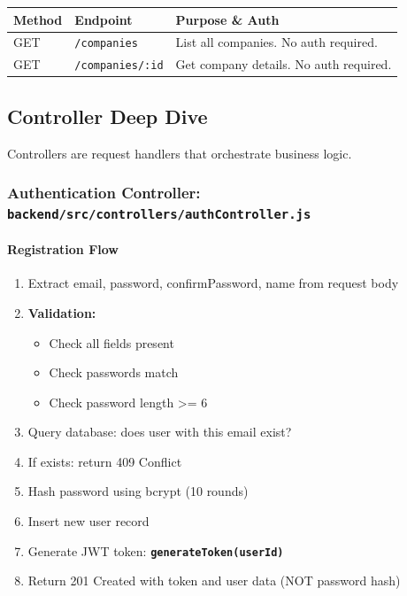\documentclass[12pt,a4paper,oneside]{article}
\newcommand{\fileref}[1]{\texttt{#1}}
\newcommand{\funcname}[1]{\texttt{\textbf{#1}}}
\begin{document}
\begin{table}[H]
\centering
\begin{tabular}{|p{1.5cm}|p{2.5cm}|p{10cm}|}
\hline
\textbf{Method} & \textbf{Endpoint} & \textbf{Purpose \& Auth} \\
\hline
GET & \texttt{/companies} & List all companies. No auth required. \\
\hline
GET & \texttt{/companies/:id} & Get company details. No auth required. \\
\hline
\end{tabular}
\end{table}

\subsection{Controller Deep Dive}

Controllers are request handlers that orchestrate business logic.

\subsubsection{Authentication Controller: \fileref{backend/src/controllers/authController.js}}

\paragraph{Registration Flow}

\begin{enumerate}
    \item Extract email, password, confirmPassword, name from request body
    \item \textbf{Validation:}
    \begin{itemize}
        \item Check all fields present
        \item Check passwords match
        \item Check password length >= 6
    \end{itemize}
    \item Query database: does user with this email exist?
    \item If exists: return 409 Conflict
    \item Hash password using bcrypt (10 rounds)
    \item Insert new user record
    \item Generate JWT token: \funcname{generateToken(userId)}
    \item Return 201 Created with token and user data (NOT password hash)
\end{enumerate}
\end{document}
